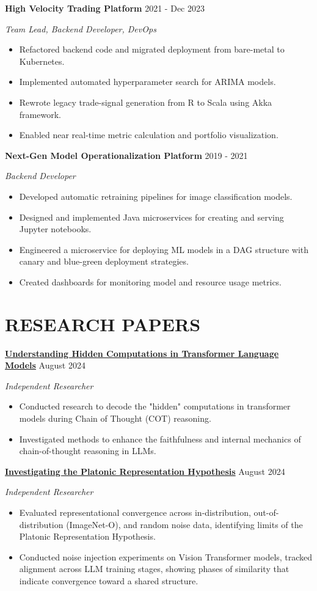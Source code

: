 \documentclass[fontsize=11pt]{article}
\newcommand{\sepspace}{\vspace*{1em}}
\newcommand{\NewPart}[1]{\section*{\uppercase{#1}}}
\newcommand{\ProjectEntry}[4]{
    \noindent \textbf{#1} \hfill {#2} \par
    \noindent \textit{#3} \par
    \noindent \small #4
    \normalsize \par}
\begin{document}
\sepspace
\ProjectEntry{High Velocity Trading Platform}{2021 - Dec 2023}{Team Lead, Backend Developer, DevOps}
{%
\begin{itemize}
\item Refactored backend code and migrated deployment from bare-metal to Kubernetes.
\item Implemented automated hyperparameter search for ARIMA models.
\item Rewrote legacy trade-signal generation from R to Scala using Akka framework.
\item Enabled near real-time metric calculation and portfolio visualization.
\end{itemize}}

\sepspace
\ProjectEntry{Next-Gen Model Operationalization Platform}{2019 - 2021}{Backend Developer}
{%
\begin{itemize}
\item Developed automatic retraining pipelines for image classification models.
\item Designed and implemented Java microservices for creating and serving Jupyter notebooks.
\item Engineered a microservice for deploying ML models in a DAG structure with canary and blue-green deployment strategies.
\item Created dashboards for monitoring model and resource usage metrics.
\end{itemize}}

\NewPart{RESEARCH PAPERS}

\ProjectEntry{\href{https://github.com/rokosbasilisk/filler_tokens}{Understanding Hidden Computations in Transformer Language Models}}{August 2024}{Independent Researcher}
{%
\begin{itemize}
\item Conducted research to decode the "hidden" computations in transformer models during Chain of Thought (COT) reasoning.
\item Investigated methods to enhance the faithfulness and internal mechanics of chain-of-thought reasoning in LLMs.
\end{itemize}}

\sepspace
\ProjectEntry{\href{https://github.com/rokosbasilisk/platonic-rep}{Investigating the Platonic Representation Hypothesis}}{August 2024}{Independent Researcher}
{%
\begin{itemize}
\item Evaluated representational convergence across in-distribution, out-of-distribution (ImageNet-O), and random noise data, identifying limits of the Platonic Representation Hypothesis. 
\item Conducted noise injection experiments on Vision Transformer models, tracked alignment across LLM training stages, showing phases of similarity that indicate convergence toward a shared structure.
\end{itemize}}
\end{document}
